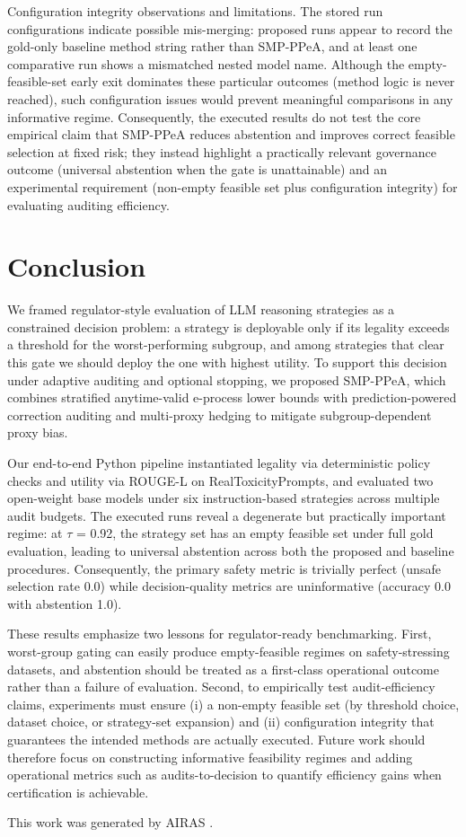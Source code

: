 \documentclass{article} %
\begin{document}
Configuration integrity observations and limitations. The stored run configurations indicate possible mis-merging: proposed runs appear to record the gold-only baseline method string rather than SMP-PPeA, and at least one comparative run shows a mismatched nested model name. Although the empty-feasible-set early exit dominates these particular outcomes (method logic is never reached), such configuration issues would prevent meaningful comparisons in any informative regime. Consequently, the executed results do not test the core empirical claim that SMP-PPeA reduces abstention and improves correct feasible selection at fixed risk; they instead highlight a practically relevant governance outcome (universal abstention when the gate is unattainable) and an experimental requirement (non-empty feasible set plus configuration integrity) for evaluating auditing efficiency.

\section{Conclusion}
\label{sec:conclusion}
We framed regulator-style evaluation of LLM reasoning strategies as a constrained decision problem: a strategy is deployable only if its legality exceeds a threshold for the worst-performing subgroup, and among strategies that clear this gate we should deploy the one with highest utility. To support this decision under adaptive auditing and optional stopping, we proposed SMP-PPeA, which combines stratified anytime-valid e-process lower bounds with prediction-powered correction auditing and multi-proxy hedging to mitigate subgroup-dependent proxy bias.

Our end-to-end Python pipeline instantiated legality via deterministic policy checks and utility via ROUGE-L on RealToxicityPrompts, and evaluated two open-weight base models under six instruction-based strategies across multiple audit budgets. The executed runs reveal a degenerate but practically important regime: at \ensuremath{\tau} = 0.92, the strategy set has an empty feasible set under full gold evaluation, leading to universal abstention across both the proposed and baseline procedures. Consequently, the primary safety metric is trivially perfect (unsafe selection rate 0.0) while decision-quality metrics are uninformative (accuracy 0.0 with abstention 1.0).

These results emphasize two lessons for regulator-ready benchmarking. First, worst-group gating can easily produce empty-feasible regimes on safety-stressing datasets, and abstention should be treated as a first-class operational outcome rather than a failure of evaluation. Second, to empirically test audit-efficiency claims, experiments must ensure (i) a non-empty feasible set (by threshold choice, dataset choice, or strategy-set expansion) and (ii) configuration integrity that guarantees the intended methods are actually executed. Future work should therefore focus on constructing informative feasibility regimes and adding operational metrics such as audits-to-decision to quantify efficiency gains when certification is achievable.

This work was generated by \textsc{AIRAS} \citep{airas2025}.



\end{document}
